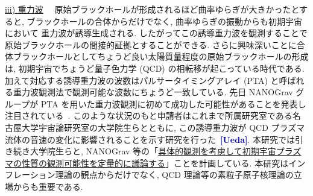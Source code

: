 \documentclass[11pt,a4paper,uplatex,dvipdfmx]{ujarticle} 		%
\newcommand{\研究課題名}{確率解析・原始ブラックホール・重力波観測から迫るインフレーション}
\newcommand{\研究機関名}{名古屋大学}
\newcommand{\研究代表者氏名}{多田祐一郎}
\newcommand{\研究期間の最終元号年度}{6}  %
\newcommand{\GW}[1]{\noindent\colorbox{GW}{\ul{iii) #1}}~~}
\newcommand{\Blue}[1]{\textcolor{darkblue}{\sffamily\gtfamily\bfseries #1}}
\begin{document}
\medskip


\GW{重力波}
原始ブラックホールが形成されるほど曲率ゆらぎが大きかったとすると, ブラックホールの合体からだけでなく, 曲率ゆらぎの振動からも初期宇宙において
重力波が誘導生成される. したがってこの誘導重力波を観測することで原始ブラックホールの間接的証拠とすることができる.
さらに興味深いことに合体ブラックホールとしてちょうど良い太陽質量程度の原始ブラックホールの形成は, 
初期宇宙でちょうど量子色力学 (QCD) の相転移が起こっている時代である.
加えて対応する誘導重力波の波数はパルサータイミングアレイ (PTA) と呼ばれる重力波観測法で観測可能な波数にちょうど一致している.
先日 NANOGrav グループが PTA を用いた重力波観測に初めて成功した可能性があることを発表し注目されている~\cite{Arzoumanian:2020vkk}.
このような状況のもと申請者はこれまで所属研究室である名古屋大学宇宙論研究室の大学院生らとともに,
この誘導重力波が QCD プラズマ流体の音速の変化に影響されることを示す研究を行った~\Blue{[Ueda]}.
本研究では引き続き大学院生らと, NANOGrav 等の「\ul{具体的観測を考慮して初期宇宙プラズマの性質の観測可能性を定量的に議論する}」ことを計画している.
本研究はインフレーション理論の観点からだけでなく, QCD 理論等の素粒子原子核理論の立場からも重要である.

\bigskip
\end{document}
